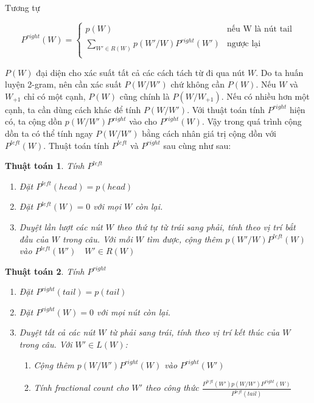 \documentclass[a4paper]{book} %
\newtheorem{algo}{Thuật toán}
\begin{document}
Tương tự

$$
P^{right}(W) = \left\{
    \begin{array}{ll}
      p(W)&\text{nếu W là nút tail}\\
      \displaystyle\sum_{W' \in R(W)}p(W'/W)P^{right}(W')&\text{ngược lại}\\
    \end{array}
  \right.
$$

$P(W)$ đại diện cho xác suất tất cả các cách tách từ đi qua nút
$W$. Do ta huấn luyện 2-gram, nên cần xác suất $P(W/W')$ chứ không cần
$P(W)$. Nếu $W$ và $W_{+1}$ chỉ có một cạnh, $P(W)$ cũng chính là
$P(W/W_{+1})$. Nếu có nhiều hơn một cạnh, ta cần dùng cách khác để
tính $P(W/W')$. Với thuật toán tính $P^{right}$ hiện có, ta cộng dồn
$p(W/W')P^{right}$ vào cho $P^{right}(W)$. Vậy trong quá trình cộng
dồn ta có thể tính ngay $P(W/W')$ bằng cách nhân giá trị cộng dồn với
$P^{left}(W)$. Thuật toán tính $P^{left}$ và $P^{right}$ sau cùng như
sau:

\begin{algo}Tính $P^{left}$

\begin{enumerate}
\item Đặt $P^{left}(head) = p(head)$
\item Đặt $P^{left}(W) = 0$ với mọi $W$ còn lại.
\item Duyệt lần lượt các nút $W$ theo thứ tự từ trái sang phải, tính
  theo vị trí bắt đầu của $W$ trong câu.
  Với mỗi $W$ tìm được, cộng thêm $p(W'/W)P^{left}(W)$ vào $P^{left}(W')\quad
  W' \in R(W)$
\end{enumerate}
\end{algo}

\begin{algo}Tính $P^{right}$
  
\begin{enumerate}
\item Đặt $P^{right}(tail) = p(tail)$
\item Đặt $P^{right}(W) = 0$ với mọi nút còn lại.
\item Duyệt tất cả các nút $W$ từ phải sang trái, tính theo vị trí kết
  thúc của $W$ trong câu. Với $W' \in L(W)$:
  \begin{enumerate}
  \item Cộng thêm $p(W/W')P^{right}(W)$ vào $P^{right}(W')$
  \item Tính fractional count cho $W'$ theo công thức
    $\displaystyle\frac{P^{left}(W')p(W/W')P^{right}(W)}{P^{left}(tail)}$
  \end{enumerate}
\end{enumerate}
\end{algo}
\end{document}
